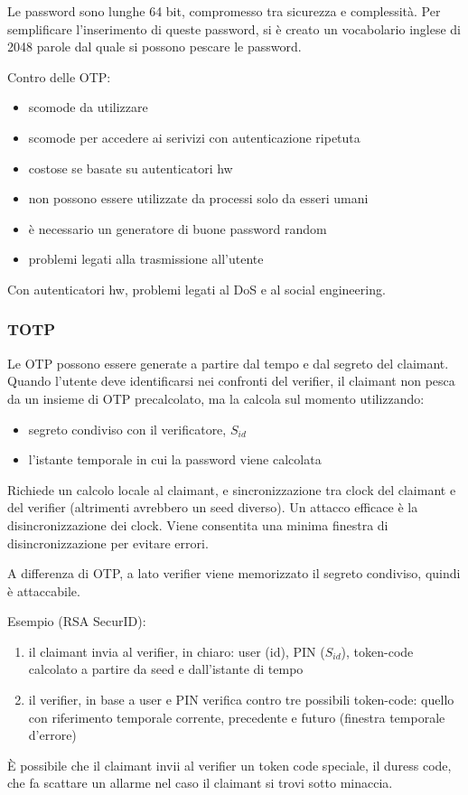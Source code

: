 \documentclass[11pt]{article}
\begin{document}
Le password sono lunghe 64 bit, compromesso tra sicurezza e complessità. Per semplificare l'inserimento di queste password, 
si è creato un vocabolario inglese di 2048 parole dal quale si possono pescare le password.

Contro delle OTP:
\begin{itemize}
    \item scomode da utilizzare 
    \item scomode per accedere ai serivizi con autenticazione ripetuta 
    \item costose se basate su autenticatori hw 
    \item non possono essere utilizzate da processi solo da esseri umani 
    \item è necessario un generatore di buone password random 
    \item problemi legati alla trasmissione all'utente 
\end{itemize}
Con autenticatori hw, problemi legati al DoS e al social engineering.
\subsubsection{TOTP}
Le OTP possono essere generate a partire dal tempo e dal segreto del claimant. 
Quando l'utente deve identificarsi nei confronti del verifier, il claimant non pesca da un insieme di OTP precalcolato, 
ma la calcola sul momento utilizzando:
\begin{itemize}
    \item segreto condiviso con il verificatore, $S_{id}$
    \item l'istante temporale in cui la password viene calcolata 
\end{itemize}
Richiede un calcolo locale al claimant, e sincronizzazione tra clock del claimant e del verifier (altrimenti avrebbero 
un seed diverso). Un attacco efficace è la disincronizzazione dei clock. Viene consentita una minima finestra di disincronizzazione per evitare errori.  

A differenza di OTP, a lato verifier viene memorizzato il segreto condiviso, quindi è attaccabile.

Esempio (RSA SecurID):
\begin{enumerate}
    \item il claimant invia al verifier, in chiaro: user (id), PIN ($S_{id}$), token-code calcolato a partire da seed e 
    dall'istante di tempo 
    \item il verifier, in base a user e PIN verifica contro tre possibili token-code: quello con riferimento temporale 
    corrente, precedente e futuro (finestra temporale d'errore)
\end{enumerate}
È possibile che il claimant invii al verifier un token code speciale, il duress code, che fa scattare un allarme nel caso 
il claimant si trovi sotto minaccia.    
\end{document}
